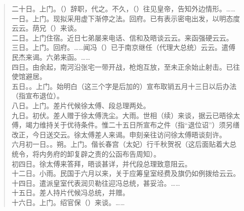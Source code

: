 \begin{quote}
	二十日。上门。（）辞职，代之。不久，（）往见皇帝，告知外边情形。……\\

一日。上门。现拟采用虚下渐停之法。回府。已有表示密电出发，以明态度云云。荫兄（）来谈。\\

二日。上门住宿。近日七弟屡来电话、信和及晤谈云云。来函强硬云云。\\

三日。上门。回府。……闻冯（）已于南京继任（代理大总统）云云。遣傅民杰来谒。六弟来函。……\\

四日。由余起，南河沿张宅一带开战，枪炮互放，至未正余始止射击。已往使馆避居。\\

五日。。上门。始明白（这三个字是后加的）宣布取销五月十三日以后办法（指宣布退位）。\\

八日。上门。差片代候徐太傅、段总理两处。\\

九日。初伏。差人赠于徐太傅洗尘。大雨。世相（续）来谈，据云已晤徐太傅，竭力维持关于优待条件。惟二十五日所宣布之件（指“退位诏”）须另缮改正，今日送交云。徐太傅差人来谒。申刻亲往访问徐太傅晤谈刻许。\\

六月初一日。。朔。上门。偕长春宫（太妃）行千秋贺祝（这后面贴着大总统令，将内务府的卸复辟之责的公函布告周知）。\\

初四日。徐太傅来答拜，晤谈甚详，并代段总理致意阻云。\\

十二日。小雨。民国于六月以来，关于应筹皇室经费及旗仍如例拨给云云。\\

十四日。遣派皇室代表润贝勒往迎冯总统，甚妥洽。……\\

十五日。差人持片代候冯总统，并赠。\\

十六日。上门。绍官保（）来谈。……\\


\end{quote}
